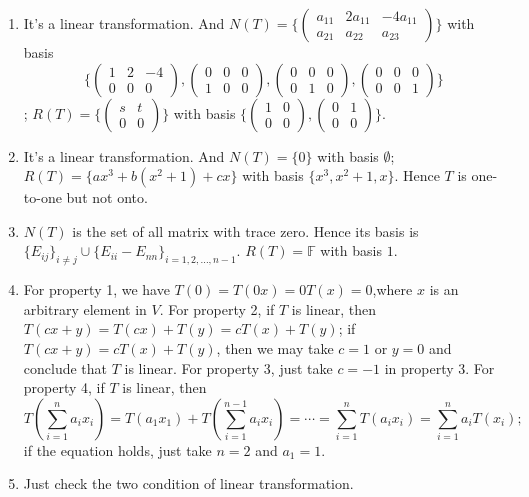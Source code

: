 \begin{enumerate}
\item It's a linear transformation. And $N(T)=\{ \left( \begin{array}{ccc}a_{11}&2a_{11}&-4a_{11}\\a_{21}&a_{22}&a_{23}\end{array}\right) \}$ with basis \[\{ \left( \begin{array}{ccc}1&2&-4\\0&0&0\end{array}\right) ,\left( \begin{array}{ccc}0&0&0\\1&0&0\end{array}\right) ,\left( \begin{array}{ccc}0&0&0\\0&1&0\end{array}\right) ,\left( \begin{array}{ccc}0&0&0\\0&0&1\end{array}\right) \} \]; $R(T)=\{ \left( \begin{array}{cc}s&t\\0&0\end{array}\right) \}$ with basis $\{ \left( \begin{array}{cc}1&0\\0&0\end{array}\right) ,\left( \begin{array}{cc}0&1\\0&0\end{array}\right)\}$.
\item It's a linear transformation. And $N(T)=\{0\}$ with basis $\emptyset $; $R(T)=\{ax^3+b(x^2+1)+cx\}$ with basis $\{x^3,x^2+1,x\}$. Hence $T$ is one-to-one but not onto.
\item $N(T)$ is the set of all matrix with trace zero. Hence its basis is $\{E_{ij}\}_{i\neq j} \cup \{E_{ii}-E_{nn}\}_{i=1,2,\ldots ,n-1}$. $R(T)=\mathbb{F}$ with basis $1$.
\item For property 1, we have $T(0)=T(0x)=0T(x)=0$,where $x$ is an arbitrary element in $V$. For property 2, if $T$ is linear, then $T(cx+y)=T(cx)+T(y)=cT(x)+T(y)$; if $T(cx+y)=cT(x)+T(y)$, then we may take $c=1$ or $y=0$ and conclude that $T$ is linear. For property 3, just take $c=-1$ in property 3. For property 4, if $T$ is linear, then \[T(\sum_{i=1}^n{a_ix_i})=T(a_1x_1)+T(\sum_{i=1}^{n-1}{a_ix_i})=\cdots =\sum_{i=1}^n{T(a_ix_i)}=\sum_{i=1}^n{a_iT(x_i)};\]
if the equation holds, just take $n=2$ and $a_1=1$.
\item Just check the two condition of linear transformation.

\end{enumerate}
